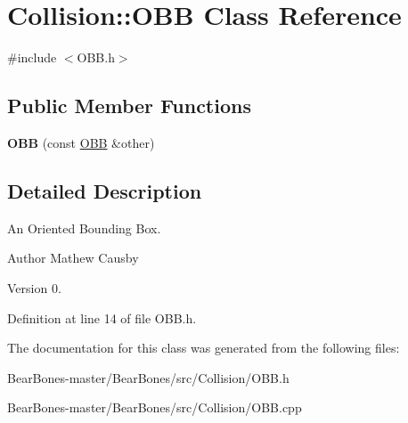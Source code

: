 \hypertarget{class_collision_1_1_o_b_b}{}\section{Collision\+:\+:O\+BB Class Reference}
\label{class_collision_1_1_o_b_b}


{\ttfamily \#include $<$O\+B\+B.\+h$>$}

\subsection*{Public Member Functions}
\begin{DoxyCompactItemize}
\item 
\mbox{\label{class_collision_1_1_o_b_b_a51cc3cb50610b7f71f35286b7279e864}} 
{\bfseries O\+BB} (const \hyperlink{class_collision_1_1_o_b_b}{O\+BB} \&other)
\end{DoxyCompactItemize}


\subsection{Detailed Description}
An Oriented Bounding Box. \begin{DoxyAuthor}{Author}
Mathew Causby 
\end{DoxyAuthor}
\begin{DoxyVersion}{Version}
0. 
\end{DoxyVersion}


Definition at line 14 of file O\+B\+B.\+h.



The documentation for this class was generated from the following files\+:\begin{DoxyCompactItemize}
\item 
Bear\+Bones-\/master/\+Bear\+Bones/src/\+Collision/O\+B\+B.\+h\item 
Bear\+Bones-\/master/\+Bear\+Bones/src/\+Collision/O\+B\+B.\+cpp\end{DoxyCompactItemize}
